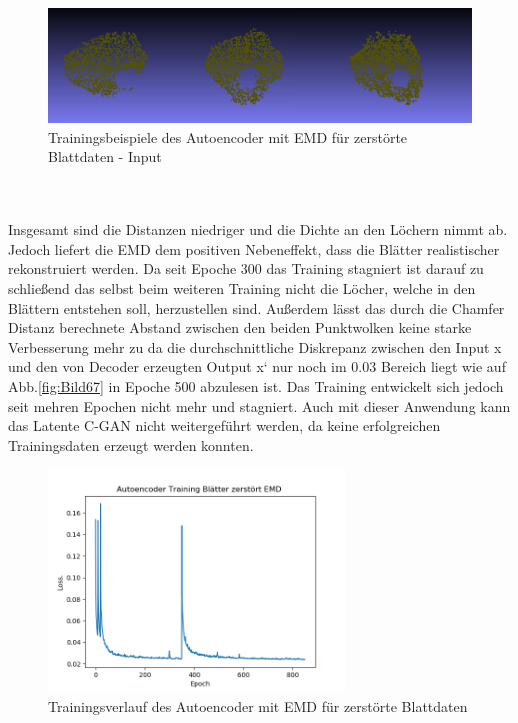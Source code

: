 \documentclass{llncs}
\begin{document}
\begin{figure}[htbp] 
	\centering
	\includegraphics[width=1.0\textwidth]{input_emd.png}
	\caption{Trainingsbeispiele des Autoencoder mit EMD für zerstörte Blattdaten - Input}
	\label{fig:Bild69}
\end{figure}
\\\\
Insgesamt sind die Distanzen niedriger und die Dichte an den Löchern nimmt ab. Jedoch liefert die EMD dem positiven Nebeneffekt, dass die Blätter realistischer rekonstruiert werden. Da seit Epoche 300 das Training stagniert ist darauf zu schließend das selbst beim weiteren Training nicht die Löcher, welche in den Blättern entstehen soll, herzustellen sind. Außerdem lässt das durch die Chamfer Distanz berechnete Abstand zwischen den beiden Punktwolken keine starke Verbesserung mehr zu da die durchschnittliche Diskrepanz zwischen den Input x und den von Decoder erzeugten Output x` nur noch im 0.03 Bereich liegt wie auf Abb.\ref{fig:Bild67} in Epoche 500 abzulesen ist. Das Training entwickelt sich jedoch seit mehren Epochen nicht mehr und stagniert. Auch mit dieser Anwendung kann das Latente C-GAN nicht weitergeführt werden, da keine erfolgreichen Trainingsdaten erzeugt werden konnten.
\begin{figure}[htbp] 
	\centering
	\includegraphics[width=0.7\textwidth]{autoencoder_training_bleatter_zer_result_emd.png}
	\caption{Trainingsverlauf des Autoencoder mit EMD für zerstörte Blattdaten }
	\label{fig:Bild71}
\end{figure}
\end{document}
